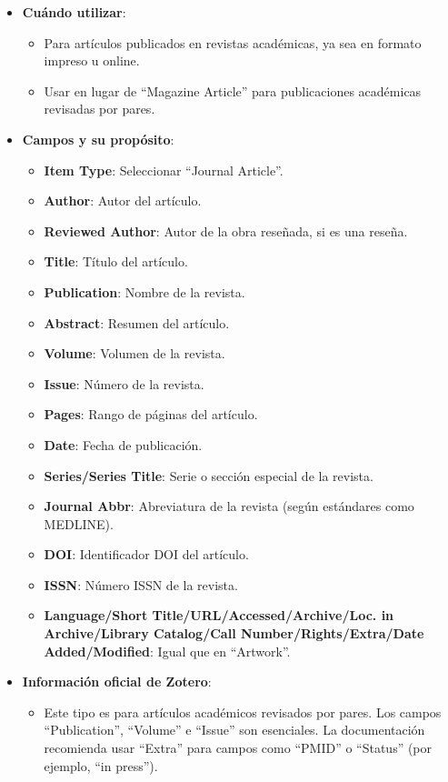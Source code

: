 \documentclass[
  jou,
  floatsintext,
  longtable,
  a4paper,
  nolmodern,
  notxfonts,
  notimes,
  12pt,
  colorlinks=true,linkcolor=blue,citecolor=blue,urlcolor=blue]{apa7}
\providecommand{\tightlist}{%
  \setlength{\itemsep}{0pt}\setlength{\parskip}{0pt}}
\begin{document}
\begin{itemize}
\tightlist
\item
  \textbf{Cuándo utilizar}:

  \begin{itemize}
  \tightlist
  \item
    Para artículos publicados en revistas académicas, ya sea en formato
    impreso u online.
  \item
    Usar en lugar de ``Magazine Article'' para publicaciones académicas
    revisadas por pares.
  \end{itemize}
\item
  \textbf{Campos y su propósito}:

  \begin{itemize}
  \tightlist
  \item
    \textbf{Item Type}: Seleccionar ``Journal Article''.
  \item
    \textbf{Author}: Autor del artículo.
  \item
    \textbf{Reviewed Author}: Autor de la obra reseñada, si es una
    reseña.
  \item
    \textbf{Title}: Título del artículo.
  \item
    \textbf{Publication}: Nombre de la revista.
  \item
    \textbf{Abstract}: Resumen del artículo.
  \item
    \textbf{Volume}: Volumen de la revista.
  \item
    \textbf{Issue}: Número de la revista.
  \item
    \textbf{Pages}: Rango de páginas del artículo.
  \item
    \textbf{Date}: Fecha de publicación.
  \item
    \textbf{Series/Series Title}: Serie o sección especial de la
    revista.
  \item
    \textbf{Journal Abbr}: Abreviatura de la revista (según estándares
    como MEDLINE).
  \item
    \textbf{DOI}: Identificador DOI del artículo.
  \item
    \textbf{ISSN}: Número ISSN de la revista.
  \item
    \textbf{Language/Short Title/URL/Accessed/Archive/Loc. in
    Archive/Library Catalog/Call Number/Rights/Extra/Date
    Added/Modified}: Igual que en ``Artwork''.
  \end{itemize}
\item
  \textbf{Información oficial de Zotero}:

  \begin{itemize}
  \tightlist
  \item
    Este tipo es para artículos académicos revisados por pares. Los
    campos ``Publication'', ``Volume'' e ``Issue'' son esenciales. La
    documentación recomienda usar ``Extra'' para campos como ``PMID'' o
    ``Status'' (por ejemplo, ``in press'').
  \end{itemize}
\end{itemize}
\end{document}
